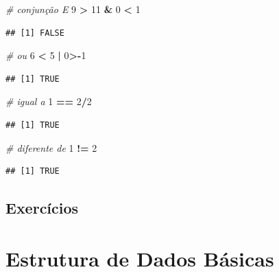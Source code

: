 \documentclass[
]{book}
\newenvironment{Shaded}{\begin{snugshade}}{\end{snugshade}}
\newcommand{\CommentTok}[1]{\textcolor[rgb]{0.56,0.35,0.01}{\textit{#1}}}
\newcommand{\DecValTok}[1]{\textcolor[rgb]{0.00,0.00,0.81}{#1}}
\newcommand{\SpecialCharTok}[1]{\textcolor[rgb]{0.81,0.36,0.00}{\textbf{#1}}}
\begin{document}
\begin{Shaded}
\begin{Highlighting}[]
\CommentTok{\# conjunção E}
\DecValTok{9} \SpecialCharTok{\textgreater{}} \DecValTok{11} \SpecialCharTok{\&} \DecValTok{0} \SpecialCharTok{\textless{}} \DecValTok{1}
\end{Highlighting}
\end{Shaded}

\begin{verbatim}
## [1] FALSE
\end{verbatim}

\begin{Shaded}
\begin{Highlighting}[]
\CommentTok{\# ou}
\DecValTok{6} \SpecialCharTok{\textless{}} \DecValTok{5} \SpecialCharTok{|} \DecValTok{0}\SpecialCharTok{\textgreater{}{-}}\DecValTok{1}
\end{Highlighting}
\end{Shaded}

\begin{verbatim}
## [1] TRUE
\end{verbatim}

\begin{Shaded}
\begin{Highlighting}[]
\CommentTok{\# igual a}
\DecValTok{1} \SpecialCharTok{==} \DecValTok{2}\SpecialCharTok{/}\DecValTok{2}
\end{Highlighting}
\end{Shaded}

\begin{verbatim}
## [1] TRUE
\end{verbatim}

\begin{Shaded}
\begin{Highlighting}[]
\CommentTok{\# diferente de}
\DecValTok{1} \SpecialCharTok{!=} \DecValTok{2}
\end{Highlighting}
\end{Shaded}

\begin{verbatim}
## [1] TRUE
\end{verbatim}

\section{Exercícios}\label{exercuxedcios}

\chapter{Estrutura de Dados Básicas}\label{estrutura-de-dados-buxe1sicas}
\end{document}
